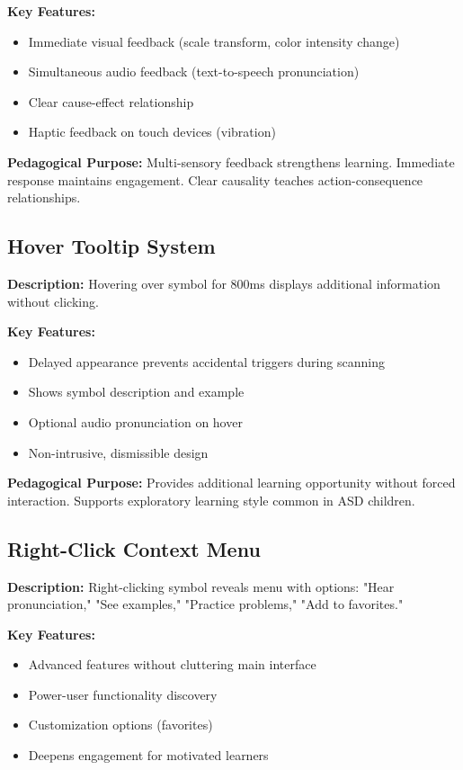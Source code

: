 \documentclass[11pt, a4paper]{article}
\begin{document}
\textbf{Key Features:}
\begin{itemize}[leftmargin=*, noitemsep]
    \item Immediate visual feedback (scale transform, color intensity change)
    \item Simultaneous audio feedback (text-to-speech pronunciation)
    \item Clear cause-effect relationship
    \item Haptic feedback on touch devices (vibration)
\end{itemize}

\textbf{Pedagogical Purpose:} Multi-sensory feedback strengthens learning. Immediate response maintains engagement. Clear causality teaches action-consequence relationships.

\subsection{Hover Tooltip System}
\textbf{Description:} Hovering over symbol for 800ms displays additional information without clicking.

\textbf{Key Features:}
\begin{itemize}[leftmargin=*, noitemsep]
    \item Delayed appearance prevents accidental triggers during scanning
    \item Shows symbol description and example
    \item Optional audio pronunciation on hover
    \item Non-intrusive, dismissible design
\end{itemize}

\textbf{Pedagogical Purpose:} Provides additional learning opportunity without forced interaction. Supports exploratory learning style common in ASD children.

\subsection{Right-Click Context Menu}
\textbf{Description:} Right-clicking symbol reveals menu with options: "Hear pronunciation," "See examples," "Practice problems," "Add to favorites."

\textbf{Key Features:}
\begin{itemize}[leftmargin=*, noitemsep]
    \item Advanced features without cluttering main interface
    \item Power-user functionality discovery
    \item Customization options (favorites)
    \item Deepens engagement for motivated learners
\end{itemize}
\end{document}
